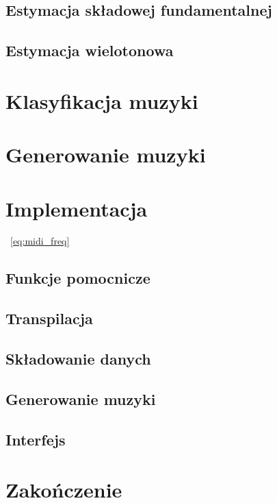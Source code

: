 \documentclass[12pt,a4paper,twoside]{mwart}
\begin{document}
\subsection{Estymacja składowej fundamentalnej}
\newpage

\subsection{Estymacja wielotonowa}


\newpage
\section{Klasyfikacja muzyki}

\section{Generowanie muzyki}
\newpage

\section{Implementacja}
\label{sec:implementacja}
~\ref{eq:midi_freq}
\subsection{Funkcje pomocnicze}
\newpage
\subsection{Transpilacja}
\newpage

\subsection{Składowanie danych}
\newpage

\subsection{Generowanie muzyki}
\newpage
\subsection{Interfejs}
\newpage
\section{Zakończenie}
\newpage
\end{document}
